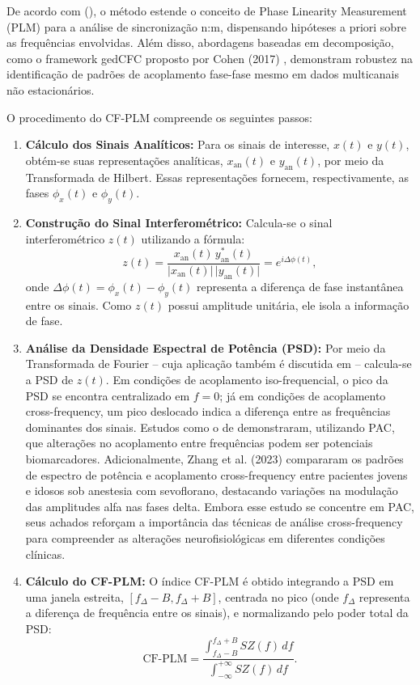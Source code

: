 De acordo com \citeauthor{sorrentino2022detection} (\citeyear{sorrentino2022detection}), o método estende o conceito de Phase Linearity Measurement (PLM) para a análise de sincronização n:m, dispensando hipóteses a priori sobre as frequências envolvidas. Além disso, abordagens baseadas em decomposição, como o framework gedCFC proposto por Cohen (2017) \cite{cohen2017multivariate}, demonstram robustez na identificação de padrões de acoplamento fase-fase mesmo em dados multicanais não estacionários.

O procedimento do CF-PLM compreende os seguintes passos:

\begin{enumerate}
    \item \textbf{Cálculo dos Sinais Analíticos:} Para os sinais de interesse, \(x(t)\) e \(y(t)\), obtém-se suas representações analíticas, \(x_{\mathrm{an}}(t)\) e \(y_{\mathrm{an}}(t)\), por meio da Transformada de Hilbert. Essas representações fornecem, respectivamente, as fases \(\phi_x(t)\) e \(\phi_y(t)\).
    \item \textbf{Construção do Sinal Interferométrico:} Calcula-se o sinal interferométrico \(z(t)\) utilizando a fórmula:
    \[
    z(t) = \frac{x_{\mathrm{an}}(t)\, y_{\mathrm{an}}^*(t)}{\lvert x_{\mathrm{an}}(t)\rvert\, \lvert y_{\mathrm{an}}(t)\rvert} = e^{i\Delta \phi(t)},
    \]
    onde \(\Delta \phi(t) = \phi_x(t) - \phi_y(t)\) representa a diferença de fase instantânea entre os sinais. Como \(z(t)\) possui amplitude unitária, ele isola a informação de fase.
    \item \textbf{Análise da Densidade Espectral de Potência (PSD):} Por meio da Transformada de Fourier -- cuja aplicação também é discutida em \cite{seraj2018} -- calcula-se a PSD de \( z(t) \). Em condições de acoplamento iso-frequencial, o pico da PSD se encontra centralizado em \(f = 0\); já em condições de acoplamento cross-frequency, um pico deslocado indica a diferença entre as frequências dominantes dos sinais. Estudos como o de \cite{chen2023multiple} demonstraram, utilizando PAC, que alterações no acoplamento entre frequências podem ser potenciais biomarcadores. Adicionalmente, Zhang et al. (2023) \cite{zhang2023differences} compararam os padrões de espectro de potência e acoplamento cross-frequency entre pacientes jovens e idosos sob anestesia com sevoflorano, destacando variações na modulação das amplitudes alfa nas fases delta. Embora esse estudo se concentre em PAC, seus achados reforçam a importância das técnicas de análise cross-frequency para compreender as alterações neurofisiológicas em diferentes condições clínicas.
    \item \textbf{Cálculo do CF-PLM:} O índice CF-PLM é obtido integrando a PSD em uma janela estreita, \([f_\Delta - B, f_\Delta + B]\), centrada no pico (onde \(f_\Delta\) representa a diferença de frequência entre os sinais), e normalizando pelo poder total da PSD:
    \[
    \text{CF-PLM} = \frac{\displaystyle\int_{f_\Delta - B}^{f_\Delta + B} SZ(f) \, df}{\displaystyle\int_{-\infty}^{+\infty} SZ(f) \, df}.
    \]
\end{enumerate}

